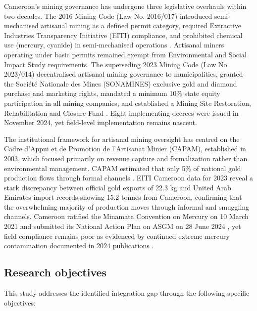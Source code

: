 \documentclass[preprint,12pt,number]{elsarticle}
\begin{document}
Cameroon's mining governance has undergone three legislative overhauls within two decades. The 2016 Mining Code (Law No. 2016/017) introduced semi-mechanised artisanal mining as a defined permit category, required Extractive Industries Transparency Initiative (EITI) compliance, and prohibited chemical use (mercury, cyanide) in semi-mechanised operations \cite{RepublicOfCameroon2016}. Artisanal miners operating under basic permits remained exempt from Environmental and Social Impact Study requirements. The superseding 2023 Mining Code (Law No. 2023/014) decentralised artisanal mining governance to municipalities, granted the Soci\'{e}t\'{e} Nationale des Mines (SONAMINES) exclusive gold and diamond purchase and marketing rights, mandated a minimum 10\% state equity participation in all mining companies, and established a Mining Site Restoration, Rehabilitation and Closure Fund \cite{UNCTAD2023}. Eight implementing decrees were issued in November 2024, yet field-level implementation remains nascent.

The institutional framework for artisanal mining oversight has centred on the Cadre d'Appui et de Promotion de l'Artisanat Minier (CAPAM), established in 2003, which focused primarily on revenue capture and formalization rather than environmental management. CAPAM estimated that only 5\% of national gold production flows through formal channels \cite{Weng2022}. EITI Cameroon data for 2023 reveal a stark discrepancy between official gold exports of 22.3 kg and United Arab Emirates import records showing 15.2 tonnes from Cameroon, confirming that the overwhelming majority of production moves through informal and smuggling channels. Cameroon ratified the Minamata Convention on Mercury on 10 March 2021 and submitted its National Action Plan on ASGM on 28 June 2024 \cite{Minamata2024}, yet field compliance remains poor as evidenced by continued extreme mercury contamination documented in 2024 publications \cite{Fonshiynwa2024, Mahmoudou2024}.

\subsection{Research objectives}

This study addresses the identified integration gap through the following specific objectives:
\end{document}
